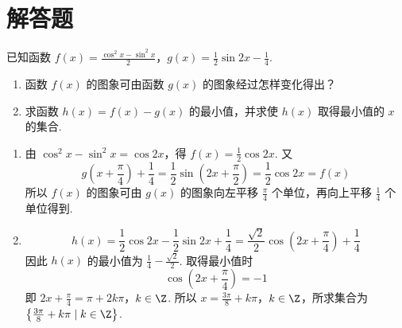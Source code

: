 \section{解答题}

\begin{problem}
已知函数 \( f(x) = \frac{\cos^2 x - \sin^2 x}{2} \)，\( g(x) = \frac{1}{2} \sin 2x - \frac{1}{4} \).
\begin{enumerate}
\item 函数 \( f(x) \) 的图象可由函数 \( g(x) \) 的图象经过怎样变化得出？
\item 求函数 \( h(x)=f(x)-g(x) \) 的最小值，并求使 \( h(x) \) 取得最小值的 \(x\) 的集合.
\end{enumerate}
\end{problem}

\begin{solution}
\begin{enumerate}
\item 由 \(\cos^2x-\sin^2x=\cos2x\)，得 \(f(x)=\frac12\cos2x\). 又
\[
g\left(x+\frac{\pi}{4}\right)+\frac14
=\frac12\sin\left(2x+\frac{\pi}{2}\right)
=\frac12\cos2x
=f(x)
\]
所以 \(f(x)\) 的图象可由 \(g(x)\) 的图象向左平移 \(\frac{\pi}{4}\) 个单位，再向上平移 \(\frac14\) 个单位得到.
\item
\[
h(x)=\frac12\cos2x-\frac12\sin2x+\frac14
=\frac{\sqrt{2}}{2}\cos\left(2x+\frac{\pi}{4}\right)+\frac14
\]
因此 \(h(x)\) 的最小值为 \(\frac14-\frac{\sqrt{2}}2\). 取得最小值时
\[
\cos\left(2x+\frac{\pi}{4}\right)=-1
\]
即 \(2x+\frac{\pi}{4}=\pi+2k\pi\)，\(k\in\Z\). 所以 \(x=\frac{3\pi}{8}+k\pi\)，\(k\in\Z\)，所求集合为 \(\left\{\frac{3\pi}{8}+k\pi\mid k\in\Z\right\}\).
\end{enumerate}
\end{solution}

